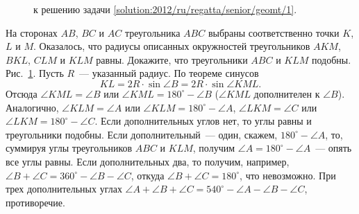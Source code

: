 \ifsolution
\begin{figure}\centering
    \caption{к решению задачи \ref{solution:2012/ru/regatta/senior/geomt/1}.}
    \label{fig:solution:2012/ru/regatta/senior/geomt/1}
\end{figure}%
\fi %

\problem
На сторонах $AB$, $BC$ и $AC$ треугольника $ABC$ выбраны соответственно точки
$K$, $L$ и $M$.
Оказалось, что радиусы описанных окружностей треугольников
$AKM$, $BKL$, $CLM$ и $KLM$ равны.
Докажите, что треугольники $ABC$ и $KLM$ подобны.
\solution
\label{solution:2012/ru/regatta/senior/geomt/1}%
Рис.~\ref{fig:solution:2012/ru/regatta/senior/geomt/1}.
Пусть $R$~--- указанный радиус.
По теореме синусов
\[
    KL = 2 R \cdot \sin \angle B = 2 R \cdot \sin \angle KML
.\]
Отсюда $\angle KML = \angle B$ или $\angle KML = 180^\circ - \angle B$
($\angle KML$ дополнителен к $\angle B$).
Аналогично,
$\angle KLM = \angle A$ или $\angle KLM = 180^\circ - \angle A$,
$\angle LKM = \angle C$ или $\angle LKM = 180^\circ - \angle C$.
Если дополнительных углов нет, то углы равны и треугольники подобны.
Если дополнительный~--- один, скажем, $180^\circ - \angle A$, то,
суммируя углы треугольников $ABC$ и $KLM$, получим
$\angle A = 180^\circ - \angle A$~--- опять все углы равны.
Если дополнительных два, то получим, например,
$\angle B + \angle C = 360^\circ - \angle B - \angle C$,
откуда $\angle B + \angle C = 180^\circ$, что невозможно.
При трех дополнительных углах
$\angle A + \angle B + \angle C = 540^\circ - \angle A - \angle B - \angle C$,
противоречие.
\endproblem
